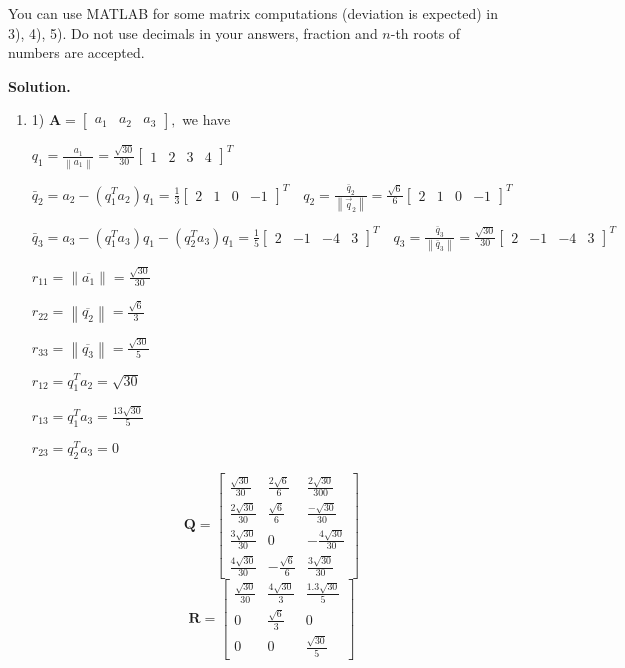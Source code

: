 \documentclass[english,onecolumn]{IEEEtran}
\begin{document}
 You can use MATLAB for some matrix computations (deviation is expected) in 3), 4), 5).
Do not use decimals in your answers, fraction and $n$-th roots of numbers are accepted.

\noindent
\textbf{Solution.}
\begin{enumerate}
	\item 1)  $\mathbf{A}=\left[\begin{array}{lll}a_{1} & a_{2} & a_{3}\end{array}\right],$ we have
	
	$q_{1}=\frac{a_{1}}{\left\|a_{1}\right\|}=\frac{\sqrt{30}}{30}
	\left[\begin{array}{llll}
		1 & 2 & 3 & 4
	\end{array}\right]^{T}$

$
\bar{q}_{2}=a_{2}-\left(q_{1}^{T} a_{2}\right) q_{1}=\frac{1}{3}
\left[\begin{array}{cccc}
	2 & 1 & 0 & -1
\end{array}\right]^{T} \quad q_{2}=\frac{\bar{q}_{2}}{\left\|\vec{q}_{2}\right\|}=\frac{\sqrt{6}}{6}
\left[\begin{array}{cccc}
	2 & 1 & 0 & -1
\end{array}\right]^{T}
$

$\bar{q}_{3}=a_{3}-\left(q_{1}^{T} a_{3}\right) q_{1}-\left(q_{2}^{T} a_{3}\right) q_{1}=\frac{1}{5}\left[\begin{array}{cccc}2 & -1 & -4 & 3\end{array}\right]^{T} \quad q_{3}=\frac{\bar{q}_{3}}{\left\|\bar{q}_{3}\right\|}=\frac{\sqrt{30}}{30}\left[\begin{array}{cccc}2 & -1 & -4 & 3\end{array}\right]^{T}$

$r_{11}=\left\|\overline{a_{1}}\right\|=\frac{\sqrt{30}}{30}$

$ r_{22}=\left\|\overline{q_{2}}\right\|=\frac{\sqrt{6}}{3} $

$r_{33}=\left\|\overline{q_{3}}\right\|=\frac{\sqrt{30}}{5}$

$r_{12}=q_{1}^{T} a_{2}=\sqrt{30} $

$ r_{13}=q_{1}^{T} a_{3}=\frac{13 \sqrt{30}}{5}$

$ r_{23}=q_{2}^{T} a_{3}=0$

$$
\mathbf{Q}=\left[\begin{array}{ccc}
	\frac{\sqrt{30}}{30} & \frac{2 \sqrt{6}}{6} & \frac{2 \sqrt{30}}{300} \\
	\frac{2 \sqrt{30}}{30} & \frac{\sqrt{6}}{6} & \frac{-\sqrt{30}}{30} \\
	\frac{3 \sqrt{30}}{30} & 0 & -\frac{4 \sqrt{30}}{30} \\
	\frac{4 \sqrt{30}}{30} & -\frac{\sqrt{6}}{6} & \frac{3 \sqrt{30}}{30}
\end{array}\right]
$$
$$
\mathbf{R}=\left[\begin{array}{ccc}
	\frac{\sqrt{30}}{30} & \frac{4\sqrt{30}}{3} & \frac{1.3 \sqrt{30}}{5} \\
	0 & \frac{\sqrt{6}}{3} & 0 \\
	0 & 0 & \frac{\sqrt{30}}{5}
\end{array}\right]
$$



\end{enumerate}
\end{document}
